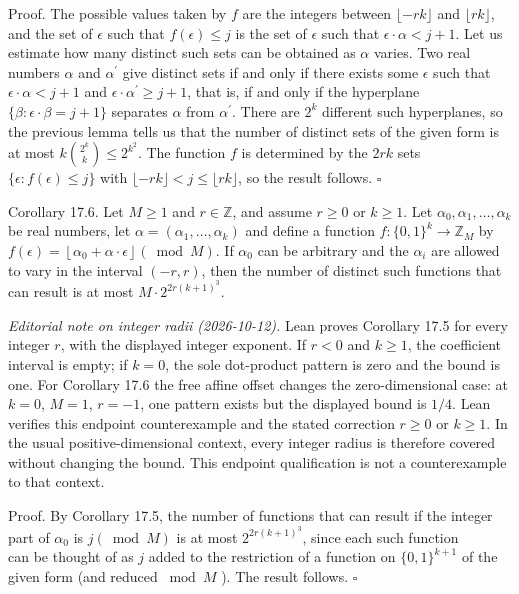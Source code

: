 \documentclass[10pt]{article}
\begin{document}
Proof. The possible values taken by $f$ are the integers between $\lfloor-r k\rfloor$ and $\lfloor r k\rfloor$, and the set of $\epsilon$ such that $f(\epsilon) \leqslant j$ is the set of $\epsilon$ such that $\epsilon \cdot \alpha<j+1$. Let us estimate how many distinct such sets can be obtained as $\alpha$ varies. Two real numbers $\alpha$ and $\alpha^{\prime}$ give distinct sets if and only if there exists some $\epsilon$ such that $\epsilon \cdot \alpha<j+1$ and $\epsilon \cdot \alpha^{\prime} \geqslant j+1$, that is, if and only if the hyperplane $\{\beta: \epsilon \cdot \beta=j+1\}$ separates $\alpha$ from $\alpha^{\prime}$. There are $2^{k}$ different such hyperplanes, so the previous lemma tells us that the number of distinct sets of the given form is at most $k\binom{2^{k}}{k} \leqslant 2^{k^{2}}$. The function $f$ is determined by the $2 r k$ sets $\{\epsilon: f(\epsilon) \leqslant j\}$ with $\lfloor-rk\rfloor<j \leqslant\lfloor rk\rfloor$, so the result follows. \(\square\)

Corollary 17.6. Let $M\geqslant1$ and $r\in\mathbb{Z}$, and assume $r\geqslant0$ or $k\geqslant1$. Let $\alpha_{0}, \alpha_{1}, \ldots, \alpha_{k}$ be real numbers, let $\alpha=\left(\alpha_{1}, \ldots, \alpha_{k}\right)$ and define a function $f:\{0,1\}^{k} \rightarrow \mathbb{Z}_{M}$ by $f(\epsilon)=\left\lfloor\alpha_{0}+\alpha \cdot \epsilon\right\rfloor(\bmod M)$. If $\alpha_{0}$ can be arbitrary and the $\alpha_{i}$ are allowed to vary in the interval $(-r, r)$, then the number of distinct such functions that can result is at most $M \cdot 2^{2 r(k+1)^{3}}$.


\emph{Editorial note on integer radii (2026-10-12).}
Lean proves Corollary 17.5 for every integer $r$, with the displayed
integer exponent. If $r<0$ and $k\geqslant1$, the coefficient interval is
empty; if $k=0$, the sole dot-product pattern is zero and the bound is one.
For Corollary 17.6 the free affine offset changes the zero-dimensional
case: at $k=0$, $M=1$, $r=-1$, one pattern exists but the displayed bound
is $1/4$. Lean verifies this endpoint counterexample and the stated
correction $r\geqslant0$ or $k\geqslant1$. In the usual positive-dimensional
context, every integer radius is therefore covered without changing the
bound. This endpoint qualification is not a counterexample to that context.

Proof. By Corollary 17.5, the number of functions that can result if the integer part of $\alpha_{0}$ is $j(\bmod M)$ is at most $2^{2 r(k+1)^{3}}$, since each such function\\
can be thought of as $j$ added to the restriction of a function on $\{0,1\}^{k+1}$ of the given form (and reduced $\bmod M$ ). The result follows. \(\square\)
\end{document}
